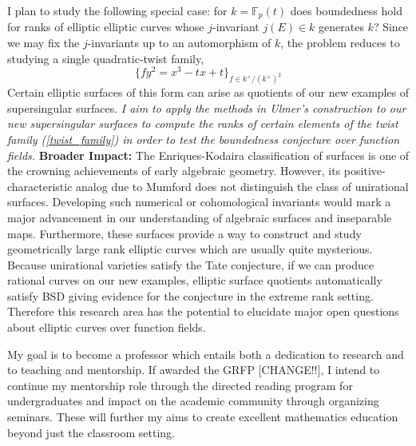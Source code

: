 \documentclass[11pt]{article}
\newcommand{\FF}{\mathbb{F}}
\begin{document}
I plan to study the following special case: for $k = \FF_p(t)$ does boundedness hold for ranks of elliptic elliptic curves whose $j$-invariant $j(E) \in k$ generates $k$? Since we may fix the $j$-invariants up to an automorphism of $k$, the problem reduces to studying a single quadratic-twist family, 
\begin{equation} \label{twist_family}
\{ f y^2 = x^3 - t x + t \}_{f \in k^\times / (k^\times)^2} 
\end{equation} 
Certain elliptic surfaces of this form can arise as quotients of our new examples of supersingular surfaces. \emph{I aim to apply the methods in Ulmer's construction to our new supersingular surfaces to compute the ranks of certain elements of the twist family (\ref{twist_family}) in order to test the boundedness conjecture over function fields.}
\newline
\noindent
\textbf{Broader Impact:}
The Enriques-Kodaira classification of surfaces is one of the crowning achievements of early algebraic geometry. However, its positive-characteristic analog due to Mumford  does not distinguish the class of unirational surfaces. Developing such numerical or cohomological invariants would mark a major advancement in our understanding of algebraic surfaces and inseparable maps. Furthermore, these surfaces provide a way to construct and study geometrically large rank elliptic curves which are usually quite mysterious. Because unirational varieties satisfy the Tate conjecture, if we can produce rational curves on our new examples, elliptic surface quotients automatically satisfy BSD giving evidence for the conjecture in the extreme rank setting. Therefore this research area has the potential to elucidate major open questions about elliptic curves over function fields.  
\par
My goal is to become a professor which entails both a dedication to research and to teaching and mentorship. If awarded the GRFP [CHANGE!!], I intend to continue my mentorship role through the directed reading program for undergraduates and impact on the academic community through organizing seminars. These will further my aims to create excellent mathematics education beyond just the classroom setting.
\vspace{-2.5em}
\begingroup
\let\enotesize\normalsize
\renewcommand\notesname{\hrulefill \vspace{-0.9em}}
\theendnotes
\endgroup
\end{document}
